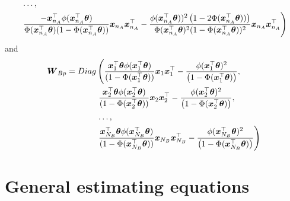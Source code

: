 \documentclass[
  letterpaper,
  DIV=11,
  numbers=noendperiod]{scrreprt}
\begin{document}
\[\begin{align}
    & \left. \ldots, \right.
    \\ 
    & \left. \frac{ - \boldsymbol{x}_{n_A}^{\top} \phi(\boldsymbol{x}_{n_A}^{\top}\boldsymbol{\theta})}{\Phi(\boldsymbol{x}_{n_A}^{\top}\boldsymbol{\theta})(1 - \Phi(\boldsymbol{x}_{n_A}^{\top}\boldsymbol{\theta}) )}\boldsymbol{x}_{n_A}\boldsymbol{x}_{n_A}^{\top} - \frac{\phi(\boldsymbol{x}_{n_A}^{\top}\boldsymbol{\theta}))^{2} \left(1 - 2\Phi(\boldsymbol{x}_{n_A}^{\top}\boldsymbol{\theta}))\right)}{\Phi(\boldsymbol{x}_{n_A}^{\top}\boldsymbol{\theta})^{2}(1 - \Phi(\boldsymbol{x}_{n_A}^{\top}\boldsymbol{\theta}) )^{2}}\boldsymbol{x}_{n_A}\boldsymbol{x}_{n_A}^{\top}\right)
\end{align}
\] and \[
\begin{align}
 \operatorname{\boldsymbol{W}}_{Bp} = Diag & \left(\frac{\boldsymbol{x}_1^{\top}\boldsymbol{\theta} \phi(\boldsymbol{x}_1^{\top}\boldsymbol{\theta})}{(1 -  \Phi(\boldsymbol{x}_1^{\top}\boldsymbol{\theta}))}\boldsymbol{x}_1\boldsymbol{x}_1^{\top} - \frac{\phi(\boldsymbol{x}_1^{\top}\boldsymbol{\theta})^{2}}{\left(1 - \Phi(\boldsymbol{x}_1^{\top}\boldsymbol{\theta}) \right)}, \right.
    \\
    & 
    \left. \frac{\boldsymbol{x}_2^{\top}\boldsymbol{\theta} \phi(\boldsymbol{x}_2^{\top}\boldsymbol{\theta})}{(1 -  \Phi(\boldsymbol{x}_2^{\top}\boldsymbol{\theta}))}\boldsymbol{x}_2\boldsymbol{x}_2^{\top} - \frac{\phi(\boldsymbol{x}_2^{\top}\boldsymbol{\theta})^{2}}{\left(1 - \Phi(\boldsymbol{x}_2^{\top}\boldsymbol{\theta}) \right)}, \right.
    \\
    & \left. \ldots, \right.
    \\
    & \left. \frac{\boldsymbol{x}_{N_B}^{\top}\boldsymbol{\theta} \phi(\boldsymbol{x}_{N_B}^{\top}\boldsymbol{\theta})}{(1 -  \Phi(\boldsymbol{x}_{N_B}^{\top}\boldsymbol{\theta}))}\boldsymbol{x}_{N_B}\boldsymbol{x}_{N_B}^{\top} - \frac{\phi(\boldsymbol{x}_{N_B}^{\top}\boldsymbol{\theta})^{2}}{\left(1 - \Phi(\boldsymbol{x}_{N_B}^{\top}\boldsymbol{\theta}) \right)}\right)
\end{align}
\]

\section{General estimating
equations}\label{general-estimating-equations}
\end{document}
